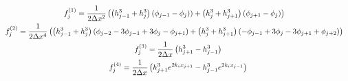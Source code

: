 \begin{gather*}
\begin{aligned}
    f_j^{(1)} %
    &= \frac{1}{2\Delta x^2} \lrp{\lrp{h_{j-1}^3 + h_{j}^3}\lrp{\phi_{j-1} - \phi_{j})} + \lrp{h_{j}^3 + h_{j+1}^3}\lrp{\phi_{j+1} - \phi_{j}}}
\end{aligned}\\
\begin{aligned}
    f_j^{(2)} %
    &= \frac{1}{2\Delta x^4} \lrp{\lrp{h_{j-1}^3 + h_{j}^3} \lrp{\phi_{j-2} - 3\phi_{j-1} + 3\phi_{j} - \phi_{j+1}} + \lrp{h_{j}^3 + h_{j+1}^3} \lrp{-\phi_{j-1} + 3\phi_{j} - 3\phi_{j+1} + \phi_{j+2}}}
\end{aligned}\\
\begin{aligned}
    f_j^{(3)} = \frac{1}{2\Delta x} \lrp{h_{j+1}^3 - h_{j-1}^3}
\end{aligned}\\
\begin{aligned}
    f_j^{(4)} = \frac{1}{2\Delta x} \lrp{h_{j+1}^3 e^{2k_i x_{j+1}} - h_{j-1}^3 e^{2k_i x_{j-1}}}
\end{aligned}
\end{gather*}
